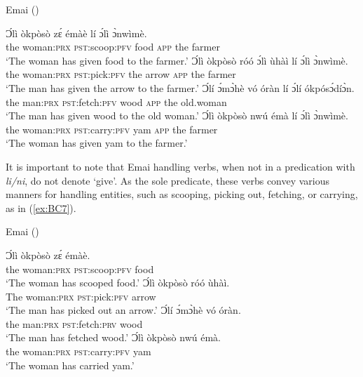 \documentclass[output=paper,colorlinks,citecolor=brown]{langscibook}
\begin{document}
\ea \label{ex:BC6} Emai (\citealt[518-525]{SchaeferEgbokhare2007})
\begin{xlist}
\ex
\gll Ɔ́lì		òkpòsò					zɛ́	émàè		lí			ɔ́lì		ɔ̀nwìmè.\\
						the	woman:\textsc{prx}	\textsc{pst}:scoop:\textsc{pfv}		food		\textsc{app}	the	farmer \\
\glt 						‘The woman has given food to the farmer.’
\ex
\gll 	Ɔ́lì		òkpòsò					róó							ɔ́lì		ùhàì			lí			ɔ́lì		ɔ̀nwìmè.\\
						the	woman:\textsc{prx}	\textsc{pst}:pick:\textsc{pfv}	the	arrow		\textsc{app}	the	farmer\\
\glt						‘The man has given the arrow to the farmer.’
\ex 
\gll 	Ɔ́lí		ɔ́mɔ̀hè			vó									óràn		lí			ɔ́lí		ókpósɔ́díɔ̀n.\\
						the	man:\textsc{prx}	\textsc{pst}:fetch:\textsc{pfv}	wood		\textsc{app}	the	old.woman \\
\glt 						‘The man has given wood to the old woman.’
\ex 
\gll 	Ɔ́lì		òkpòsò					nwú								émà		lí			ɔ́lì		ɔ̀nwìmè. \\
						the	woman:\textsc{prx}	\textsc{pst}:carry:\textsc{pfv}	yam		\textsc{app}	the	farmer \\
\glt 						‘The woman has given yam to the farmer.’
\end{xlist}
\z

It is important to note that Emai handling verbs, when not in a predication with \textit{li/ni}, do not denote ‘give’. As the sole predicate, these verbs convey various manners for handling entities, such as scooping, picking out, fetching, or carrying, as in (\ref{ex:BC7}).

\ea \label{ex:BC7} Emai (\citealt[518-525]{SchaeferEgbokhare2007})
\begin{xlist}
\ex
\gll Ɔ́lì		òkpòsò					zɛ́										émàè.\\
						the	woman:\textsc{prx}	\textsc{pst}:scoop:\textsc{pfv}		food\\
\glt						‘The woman has scooped food.’
\ex
\gll 	Ɔ́lì		òkpòsò					róó								ùhàì.\\
						The	woman:\textsc{prx}	\textsc{pst}:pick:\textsc{pfv}		arrow\\
\glt ‘The man has picked out an arrow.’
\ex
\gll 	Ɔ́lí		ɔ́mɔ̀hè			vó									óràn.\\
						the	man:\textsc{prx}	\textsc{pst}:fetch:\textsc{prv}	wood\\
\glt					‘The man has fetched wood.’
\ex
\gll 	Ɔ́lì		òkpòsò					nwú								émà.\\
						the	woman:\textsc{prx}	\textsc{pst}:carry:\textsc{pfv}	yam\\
\glt					‘The woman has carried yam.’
\end{xlist}
\z
\end{document}
